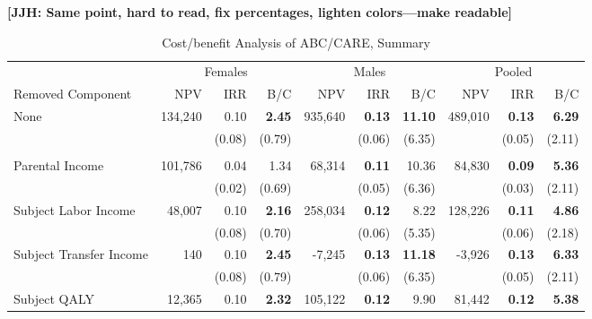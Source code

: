 \documentclass[static]{JJH-Beamer}
\newcommand{\mc}{\multicolumn}
\begin{document}
\clearpage

\textbf{[JJH: Same point, hard to read, fix percentages, lighten colors---make readable]}
\clearpage

\begin{frame}[shrink=10]

\begin{table}[H]
\caption{Cost/benefit Analysis of ABC/CARE, Summary}\label{table:cba}
\begin{center}
\begin{tabular}{l r r r r r r r r r}																			
\toprule																			
&       \mc{3}{c}{Females}      &       \mc{3}{c}{Males}        &       \mc{3}{c}{Pooled}       \\																			
\cmidrule(lr){2-4}      \cmidrule(lr){5-7}      \cmidrule(lr){8-10}																			
Removed Component       &       NPV     &       IRR     &       B/C     &       NPV     &       IRR     &       B/C     &       NPV     &       IRR     &       B/C     \\																			
\midrule																			
None	&	134,240	&	0.10	&	\textbf{2.45}	&	935,640	&	\textbf{0.13}	&	\textbf{11.10}	&	489,010	&	\textbf{0.13}	&	\textbf{6.29}	\\
	&		&	(0.08)	&	(0.79)	&		&	(0.06)	&	(6.35)	&		&	(0.05)	&	(2.11)	\\ \\
Parental Income	&	101,786	&	0.04	&	1.34	&	68,314	&	\textbf{0.11}	&	10.36	&	84,830	&	\textbf{0.09}	&	\textbf{5.36}	\\
	&		&	(0.02)	&	(0.69)	&		&	(0.05)	&	(6.36)	&		&	(0.03)	&	(2.11)	\\
Subject Labor Income	&	48,007	&	0.10	&	\textbf{2.16}	&	258,034	&	\textbf{0.12}	&	8.22	&	128,226	&	\textbf{0.11}	&	\textbf{4.86}	\\
	&		&	(0.08)	&	(0.70)	&		&	(0.06)	&	(5.35)	&		&	(0.06)	&	(2.18)	\\
Subject Transfer Income	&	140	&	0.10	&	\textbf{2.45}	&	-7,245	&	\textbf{0.13}	&	\textbf{11.18}	&	-3,926	&	\textbf{0.13}	&	\textbf{6.33}	\\
	&		&	(0.08)	&	(0.79)	&		&	(0.06)	&	(6.35)	&		&	(0.05)	&	(2.11)	\\
Subject QALY	&	12,365	&	0.10	&	\textbf{2.32}	&	105,122	&	\textbf{0.12}	&	9.90	&	81,442	&	\textbf{0.12}	&	\textbf{5.38}	\\

\end{tabular}
\end{center}
\end{table}
\end{frame}
\end{document}
